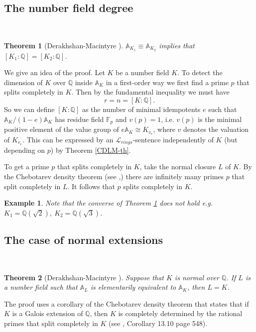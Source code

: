 \documentclass[12pt]{amsart}
\def\A{\mathbb{A}}
\def\F{\mathbb{F}}
\def\cL{\mathcal{L}}
\def\Q{\mathbb{Q}}
\def\F{\mathbb{F}}
\def\cL{\mathcal{L}}
\newtheorem{thm}{Theorem}[section]
\newtheorem{ex}{Example}[section]
\numberwithin{equation}{section}
\begin{document}
\medskip

\subsection{\bf The number field degree}
 
\

\medskip

\begin{thm}[Derakhshan-Macintyre {\cite{DM-ad2}}]\label{deg} $\A_{K_1}\equiv \A_{K_2}$ implies that $[K_1:\Q]=[K_2:\Q]$.\end{thm}

We give an idea of the proof. Let $K$ be a number field $K$. To detect the dimension of $K$ over $\Q$ inside $\A_K$ in a first-order way we first find a 
prime $p$ that splits completely in $K$. Then by the fundamental inequality we must have 
$$r=n=[K:\Q].$$
So we can define $[K:\Q]$ as the number of minimal idempotents $e$ such that $\A_K/(1-e)\A_K$ has 
residue field $\F_p$ and $v(p)=1$, i.e. $v(p)$ is the minimal positive element of the value group of $e\A_K \cong K_{v_e}$, where $v$ denotes the valuation of $K_{v_e}$. This 
can be expressed by an $\cL_{rings}$-sentence independently of $K$ (but depending on $p$) by Theorem \ref{CDLM-th}. 

To get a prime $p$ that splits completely in $K$, take the normal closure $L$ of $K$. By the  
Chebotarev density theorem (see \cite{manin-book},\cite{nkrch}) there are infinitely many primes $p$ that split 
completely in $L$. It follows that $p$ splits completely in $K$.  

\begin{ex} Note that the converse of Theorem \ref{deg} does not hold e.g. $K_1=\Q(\sqrt{2}),~ K_2=\Q(\sqrt{3})$. \end{ex}

\medskip

\subsection{\bf The case of normal extensions}

\

\medskip

\begin{thm}[Derakhshan-Macintyre {\cite{DM-ad2}}] Suppose that $K$ is normal over $\Q$. If $L$ is a number field such that $\A_L$ is elementarily equivalent to 
$\A_K$, then $L=K$.\end{thm}
The proof uses a corollary of the Chebotarev density theorem that states that 
if $K$ is a Galois extension of $\Q$, then $K$ is completely determined by the rational primes that split completely in $K$ (see \cite{nkrch}, Corollary 13.10 page 548). 
\end{document}
